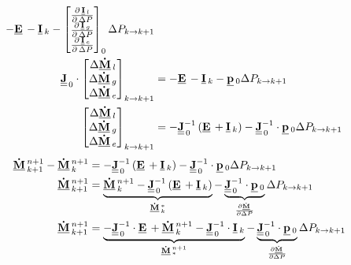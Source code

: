 \begin{align}
 -\vec{E} -
 \vec{I}_{k} -
 \begin{bmatrix}
 \DerivParOne{\vec{I}_{l}}{\Delta P} \\
 \DerivParOne{\vec{I}_{g}}{\Delta P} \\
 \DerivParOne{\vec{I}_{e}}{\Delta P}
 \end{bmatrix}_{0}
 \Delta P_{k \rightarrow k+1} \\
 \mat{J}_{\,0}
 \cdot
 \begin{bmatrix}
 \Delta \vec{\dot{M}}_l \\
 \Delta \vec{\dot{M}}_g \\
 \Delta \vec{\dot{M}}_e
 \end{bmatrix}_{k\rightarrow k+1} & =
 -\vec{E} -
 \vec{I}_{k} -
 \vec{p}_{0}
 \Delta P_{k \rightarrow k+1} \\
 \begin{bmatrix}
 \Delta \vec{\dot{M}}_l \\
 \Delta \vec{\dot{M}}_g \\
 \Delta \vec{\dot{M}}_e
 \end{bmatrix}_{k\rightarrow k+1} & =
 -\mat{J}_{\,0}^{-1}\left(\vec{E} + \vec{I}_{k}\right) -
 \mat{J}_{\,0}^{-1} \cdot \vec{p}_{0} \Delta P_{k \rightarrow k+1} 
  \end{align}
  \begin{align}
 \vec{\dot{M}}^{n+1}_{k+1}- \vec{\dot{M}}^{n+1}_{k} & =
 -\mat{J}_{\,0}^{-1}\left(\vec{E} + \vec{I}_{k}\right) -
 \mat{J}_{\,0}^{-1} \cdot \vec{p}_{0} \Delta P_{k \rightarrow k+1}\\
 \vec{\dot{M}}^{n+1}_{k+1} & =
 \underbrace{\vec{\dot{M}}^{n+1}_{k} -\mat{J}_{\,0}^{-1}\left(\vec{E} + \vec{I}_{k}\right)}_{\vec{\dot{M}}^{*}_{k}} - \underbrace{\mat{J}_{\,0}^{-1} \cdot \vec{p}_{0}}_{\frac{\partial \vec{\dot{M}}}{\partial \Delta P}} \Delta P_{k \rightarrow k+1} \\
 \vec{\dot{M}}^{n+1}_{k+1} & =
 \underbrace{-\mat{J}_{\,0}^{-1}\cdot \vec{E} + \vec{\dot{M}}^{n+1}_{k} - \mat{J}^{-1}_{\,0}\cdot \vec{I}_{k}}_{\vec{\dot{M}}^{n+1}_{*}} - \underbrace{\mat{J}_{\,0}^{-1} \cdot \vec{p}_{0}}_{\frac{\partial \vec{\dot{M}}}{\partial \Delta P}} \Delta P_{k \rightarrow k+1}
 \end{align}

